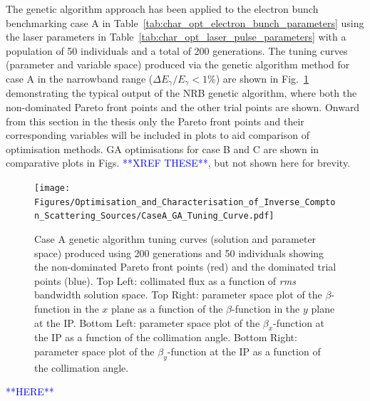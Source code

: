 \documentclass[../main.tex]{subfiles}
\begin{document}
The genetic algorithm approach has been applied to the electron bunch benchmarking case A in Table~\ref{tab:char_opt_electron_bunch_parameters} using the laser parameters in Table~\ref{tab:char_opt_laser_pulse_parameters} with a population of 50 individuals and a total of 200 generations. The tuning curves (parameter and variable space) produced via the genetic algorithm method for case A in the narrowband range ($\Delta E_{\gamma}/E_{\gamma}<1\%$) are shown in Fig.~\ref{fig:case_A_GA_tuning_curves} demonstrating the typical output of the NRB genetic algorithm, where both the non-dominated Pareto front points and the other trial points are shown. Onward from this section in the thesis only the Pareto front points and their corresponding variables will be included in plots to aid comparison of optimisation methods. GA optimisations for case B and C are shown in comparative plots in Figs. \textcolor{blue}{**XREF THESE**}, but not shown here for brevity. 
\begin{figure}[!h]
\centering
\texttt{[image: Figures/Optimisation\_and\_Characterisation\_of\_Inverse\_Compton\_Scattering\_Sources/CaseA\_GA\_Tuning\_Curve.pdf]}
\caption{Case A genetic algorithm tuning curves (solution and parameter space) produced using 200 generations and 50 individuals showing the non-dominated Pareto front points (red) and the dominated trial points (blue). Top Left: collimated flux as a function of \textit{rms} bandwidth solution space. Top Right: parameter space plot of the $\beta$-function in the $x$ plane as a function of the $\beta$-function in the $y$ plane at the IP. Bottom Left: parameter space plot of the $\beta_{x}$-function at the IP as a function of the collimation angle. Bottom Right: parameter space plot of the $\beta_{y}$-function at the IP as a function of the collimation angle.}
\label{fig:case_A_GA_tuning_curves}
\end{figure}

\textcolor{blue}{**HERE**}
\end{document}
